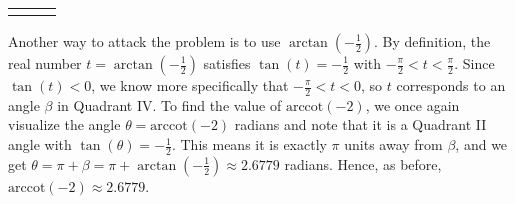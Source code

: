 \documentclass[12pt]{ximera}
\begin{document}
\begin{example}
\begin{enumerate}
\begin{enumerate}
\begin{tabular}{m{2.5in}m{1in}m{2.5in}}



& 

&

 \\ 

\end{tabular}

Another way to attack the problem is to use $\arctan\left(-\frac{1}{2}\right)$.  By definition, the real number $t = \arctan\left(-\frac{1}{2}\right)$ satisfies $\tan(t) = -\frac{1}{2}$ with $-\frac{\pi}{2} < t < \frac{\pi}{2}$.  Since $\tan(t)<0$, we know more specifically that $-\frac{\pi}{2} < t < 0$, so $t$ corresponds to an angle $\beta$ in Quadrant IV.  To find the value of $\mbox{arccot}(-2)$, we once again visualize the angle $\theta = \mbox{arccot}(-2)$ radians and note that it is a Quadrant II angle with $\tan(\theta) = -\frac{1}{2}$.  This means it is exactly $\pi$ units away from $\beta$, and we get $\theta = \pi + \beta = \pi + \arctan\left(-\frac{1}{2}\right) \approx 2.6779$ radians.  Hence, as before, $\mbox{arccot}(-2) \approx 2.6779$.

\begin{tabular}{m{2.5in}m{1in}m{2.5in}}




\end{tabular}
\end{enumerate}
\end{enumerate}
\end{example}
\end{document}
